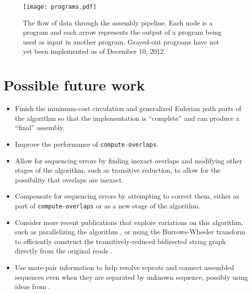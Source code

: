 \documentclass[12pt]{article}
\newcommand{\ProgramName}[1]{{\tt #1}}
\begin{document}
\begin{figure}
	\begin{center}
		\texttt{[image: programs.pdf]}
	\end{center}
	\caption{The flow of data through the assembly pipeline.  Each node is a
	program and each arrow represents the output of a program being used as
	input in another program.  Grayed-out programs have not yet been implemented
	as of December 10, 2012.}
	\label{fig:impl_graph}
\end{figure}

\section{Possible future work}

\begin{itemize}
\item Finish the minimum-cost circulation and generalized Eulerian path parts of
the algorithm so that the implementation is ``complete'' and can produce a
``final'' assembly.
\item Improve the performance of \ProgramName{compute-overlaps}.
\item Allow for sequencing errors by finding inexact overlaps and modifying other
stages of the algorithm, such as transitive reduction, to allow for the
possibility that overlaps are inexact.
\item Compensate for sequencing errors by attempting to correct them, either as
part of \ProgramName{compute-overlaps} or as a new stage of the algorithm.
\item Consider more recent publications that explore variations on this
algorithm, such as parallelizing the algorithm \cite{Jackson2008}, or using the
Burrows-Wheeler transform to efficiently construct the transitively-reduced
bidirected string graph directly from the original reads \cite{Simpson2010}.
\item Use mate-pair information to help resolve repeats and connect assembled
sequences even when they are separated by unknown sequence, possibly using ideas
from \cite{Medvedev2009}.
\end{itemize}



\end{document}

